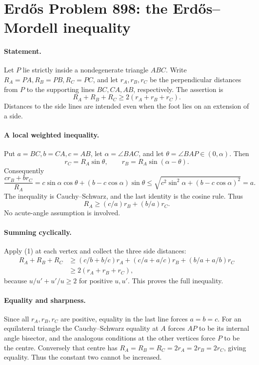 \section*{Erd\H{o}s Problem 898: the Erd\H{o}s--Mordell inequality}

\paragraph{Statement.}
Let \(P\) lie strictly inside a nondegenerate triangle \(ABC\).
Write \(R_A=PA,R_B=PB,R_C=PC\), and let \(r_A,r_B,r_C\)
be the perpendicular distances from \(P\) to the supporting
lines \(BC,CA,AB\), respectively. The assertion is
\[
 R_A+R_B+R_C\geq2(r_A+r_B+r_C).
\]
Distances to the side lines are intended even when the foot
lies on an extension of a side.

\paragraph{A local weighted inequality.}
Put \(a=BC,b=CA,c=AB\), let \(\alpha=\angle BAC\), and let
\(\theta=\angle BAP\in(0,\alpha)\). Then
\[
 r_C=R_A\sin\theta,\qquad
 r_B=R_A\sin(\alpha-\theta).
\]
Consequently
\[
 \frac{c r_B+b r_C}{R_A}
 =c\sin\alpha\cos\theta+(b-c\cos\alpha)\sin\theta
 \leq\sqrt{c^2\sin^2\alpha+(b-c\cos\alpha)^2}
 =a.
\]
The inequality is Cauchy--Schwarz, and the last identity is
the cosine rule. Thus
\[
 R_A\geq(c/a)r_B+(b/a)r_C.
\tag{1}
\]
No acute-angle assumption is involved.

\paragraph{Summing cyclically.}
Apply (1) at each vertex and collect the three side distances:
\[
 \begin{split}
 R_A+R_B+R_C
 &\geq (c/b+b/c)r_A
      +(c/a+a/c)r_B
      +(b/a+a/b)r_C\\
 &\geq2(r_A+r_B+r_C),
 \end{split}
\]
because \(u/u'+u'/u\geq2\) for positive \(u,u'\).
This proves the full inequality.

\paragraph{Equality and sharpness.}
Since all \(r_A,r_B,r_C\) are positive, equality in the
last line forces \(a=b=c\).
For an equilateral triangle the Cauchy--Schwarz equality
at \(A\) forces \(AP\) to be its internal angle bisector,
and the analogous conditions at the other vertices force
\(P\) to be the centre. Conversely that centre has
\(R_A=R_B=R_C=2r_A=2r_B=2r_C\), giving equality.
Thus the constant two cannot be increased.

